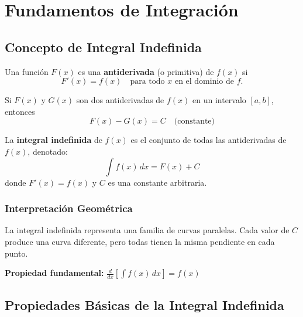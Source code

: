 \documentclass[12pt, a4paper]{book}
\begin{document}
\maketitle

\tableofcontents
\newpage

\chapter{Fundamentos de Integración}

\section{Concepto de Integral Indefinida}

\begin{definicion}
Una función $F(x)$ es una \textbf{antiderivada} (o primitiva) de $f(x)$ si
\[
F'(x) = f(x) \quad \text{para todo } x \text{ en el dominio de } f.
\]
\end{definicion}

\begin{teorema}
Si $F(x)$ y $G(x)$ son dos antiderivadas de $f(x)$ en un intervalo $[a,b]$, entonces
\[
F(x) - G(x) = C \quad \text{(constante)}
\]
\end{teorema}

\begin{definicion}
La \textbf{integral indefinida} de $f(x)$ es el conjunto de todas las antiderivadas de $f(x)$, denotado:
\[
\int f(x) \, dx = F(x) + C
\]
donde $F'(x) = f(x)$ y $C$ es una constante arbitraria.
\end{definicion}

\subsection{Interpretación Geométrica}

La integral indefinida representa una familia de curvas paralelas. Cada valor de $C$ produce una curva diferente, pero todas tienen la misma pendiente en cada punto.

\begin{tcolorbox}
\textbf{Propiedad fundamental:} $\frac{d}{dx}\left[\int f(x) \, dx\right] = f(x)$
\end{tcolorbox}

\section{Propiedades Básicas de la Integral Indefinida}
\end{document}
